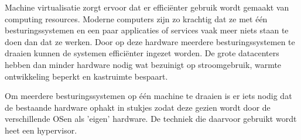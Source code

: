 Machine virtualisatie zorgt ervoor dat er effici\"enter gebruik wordt gemaakt van computing resources. Moderne computers zijn zo krachtig dat ze met \'e\'en besturingssystemen en een paar applicaties of services vaak meer niets staan te doen dan dat ze werken. Door op deze hardware meerdere besturingssystemen te draaien kunnen de systemen effici\"enter ingezet worden. De grote datacenters hebben dan minder hardware nodig wat bezuinigt op stroomgebruik, warmte ontwikkeling beperkt en kastruimte bespaart.

Om meerdere besturingssystemen op \'e\'en machine te draaien is er iets nodig dat de bestaande hardware ophakt in stukjes zodat deze gezien wordt door de verschillende OSen als 'eigen' hardware. De techniek die daarvoor gebruikt wordt heet een hypervisor.
